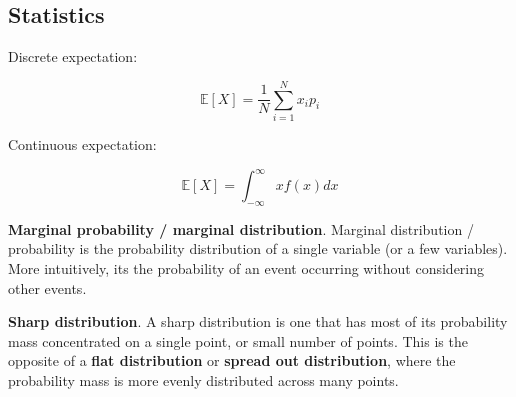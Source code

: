 \subsection{Statistics}
\label{appendix:statistics}

Discrete expectation:

\[ \mathbb{E}[X] = \frac{1}{N} \sum_{i=1}^{N} x_i p_i \]

Continuous expectation:

\[ \mathbb{E}[X] = \int_{-\infty}^{\infty} x f(x) dx \]






\textbf{Marginal probability / marginal distribution}. Marginal distribution / probability is the probability distribution of a single variable (or a few variables). More intuitively, its the probability of an event occurring without considering other events.



\textbf{Sharp distribution}. A sharp distribution is one that has most of its probability mass concentrated on a single point, or small number of points. This is the opposite of a \textbf{flat distribution} or \textbf{spread out distribution}, where the probability mass is more evenly distributed across many points.